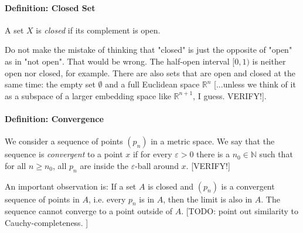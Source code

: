 \paragraph{Definition: Closed Set} A set $X$ is \emph{closed} if its complement is open.

\medskip
Do not make the mistake of thinking that "closed" is just the opposite of "open" as in "not open". That would be wrong. The half-open interval $[0,1)$ is neither open nor closed, for example. There are also sets that are open and closed at the same time: the empty set $\emptyset$ and a full Euclidean space $\mathbb{R}^n$ [...unless we think of it as a subspace of a larger embedding space like $\mathbb{R}^{n+1}$, I guess. VERIFY!]. 



\paragraph{Definition: Convergence} We consider a sequence of points $(p_n)$ in a metric space. We say that the sequence is \emph{convergent} to a point $x$ if for every $\varepsilon > 0$ there is a $n_0 \in \mathbb{N}$ such that for all $n \geq n_0$, all $p_n$ are inside the $\varepsilon$-ball around $x$. [VERIFY!]

\medskip
An important observation is: If a set $A$ is closed and $(p_n)$ is a convergent sequence of points in $A$, i.e. every $p_n$ is in $A$, then the limit is also in $A$. The sequence cannot converge to a point outside of $A$. [TODO: point out similarity to Cauchy-completeness. ]





% 


